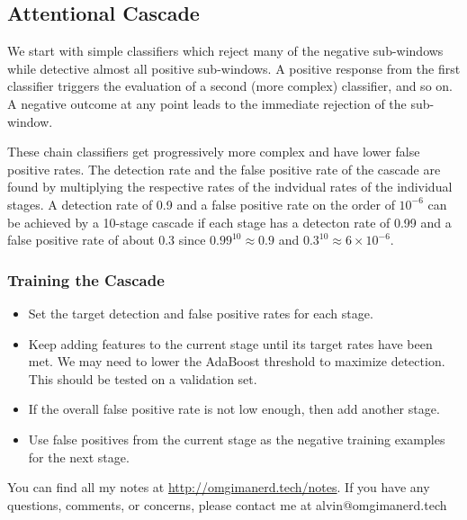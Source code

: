 \documentclass{math}
\begin{document}
\subsection*{Attentional Cascade}
We start with simple classifiers which reject many of the negative sub-windows
while detective almost all positive sub-windows. A positive response from the
first classifier triggers the evaluation of a second (more complex) classifier,
and so on. A negative outcome at any point leads to the immediate rejection of
the sub-window.
\begin{center}
\end{center}
These chain classifiers get progressively more complex and have lower false
positive rates. The detection rate and the false positive rate of the cascade
are found by multiplying the respective rates of the indvidual rates of the
individual stages. A detection rate of 0.9 and a false positive rate on the
order of \( 10^{-6} \) can be achieved by a 10-stage cascade if each stage
has a detecton rate of 0.99 and a false positive rate of about 0.3 since
\( 0.99^10 \approx 0.9 \) and \( 0.3^10 \approx 6\times10^{-6} \).

\subsubsection*{Training the Cascade}
\begin{itemize}
  \item Set the target detection and false positive rates for each stage.
  \item Keep adding features to the current stage until its target rates have
    been met. We may need to lower the AdaBoost threshold to maximize detection.
    This should be tested on a validation set.
  \item If the overall false positive rate is not low enough, then add another
    stage.
  \item Use false positives from the current stage as the negative training
    examples for the next stage.
\end{itemize}

\begin{center}
  You can find all my notes at \url{http://omgimanerd.tech/notes}. If you have
  any questions, comments, or concerns, please contact me at
  alvin@omgimanerd.tech
\end{center}
\end{document}
